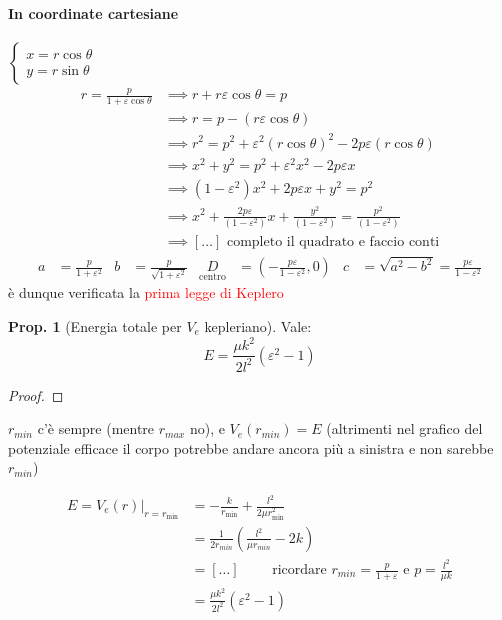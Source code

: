 \documentclass[a4paper,10pt]{article}
\theoremstyle{definition}
\theoremstyle{indentdefinition}
\theoremstyle{indenttheorem}
\newtheorem{prop}{Prop.}
\theoremstyle{myremark}
\theoremstyle{indentgeneral}
\begin{document}
\paragraph{In coordinate cartesiane} $\begin{cases}
    x=r\cos\theta \\
    y=r\sin\theta
\end{cases}$
\begin{align*}
r=\frac{p}{1+\varepsilon\cos\theta}&\implies r+ r\varepsilon\cos\theta=p \\
&\implies r=p-(r\varepsilon\cos\theta)\\
&\implies  r^{2}=p^{2}+\varepsilon^{2}\left(r\cos\theta\right)^{2}-2p\varepsilon\left(r\cos\theta\right) \\
&\implies x^{2}+y^{2}=p^{2}+\varepsilon^{2}x^{2}-2p\varepsilon x  \\
&\implies (1-\varepsilon^2)x^2+2p\varepsilon  x+y^2 =p^2 \\
&\implies x^2+\frac{2p\varepsilon}{(1-\varepsilon^2)}x+\frac{y^2}{(1-\varepsilon^2)}=\frac{p^2}{(1-\varepsilon^2)} \\
&\implies [\dots] \text{ completo il quadrato e faccio conti}
\end{align*}
\begin{align*}
a & =\frac{p}{1+\varepsilon^{2}} & b & =\frac{p}{\sqrt{1+\varepsilon^{2}}} & \underset{\text{centro}}{D} & =\left(-\frac{p\varepsilon}{1-\varepsilon^{2}},0\right) & c & =\sqrt{a^{2}-b^{2}}=\frac{p\varepsilon}{1-\varepsilon^{2}}
\end{align*}
è dunque verificata la  \textcolor{red}{prima legge di Keplero}


\begin{prop}[Energia totale per $V_{e}$ kepleriano] Vale: $$E=\frac{\mu k^{2}}{2l^{2}}\left(\varepsilon^{2}-1\right)$$
\end{prop}
\begin{proof}
    
\end{proof}
$r_{min}$ c'è sempre (mentre $r_{max}$ no), e $V_e(r_{min})=E$ (altrimenti nel grafico del potenziale efficace il corpo potrebbe andare ancora più a sinistra e non sarebbe $r_{min}$)

\begin{align*}
E=\left.V_{e}\left(r\right)\right|_{r=r_{\min}}&=-\frac{k}{r_{\min}}+\frac{l^{2}}{2\mu r_{\min}^{2}} \\
&=\frac{1}{2r_{min}}\left(\frac{l^2}{\mu r_{min}}-2k\right) \\
&= [\dots] \qquad\text{ ricordare $r_{min}=\frac{p}{1+\varepsilon}$ e $p=\frac{l^{2}}{\mu k}$} \\
&=\frac{\mu k^{2}}{2l^{2}}\left(\varepsilon^{2}-1\right) 
\end{align*}
\end{document}
